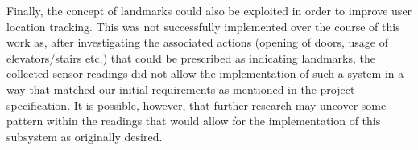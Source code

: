\documentclass[main.tex]{subfiles}
\begin{document}
            Finally, the concept of landmarks could also be exploited in order to improve user location tracking. This
            was not successfully implemented over the course of this work as, after investigating the associated actions (opening of doors, usage of elevators/stairs etc.) that could be prescribed as indicating landmarks,
            the collected sensor readings did not allow the implementation of such a system in a way that matched our initial requirements as mentioned in the project specification. It is possible, however, that further research may uncover some pattern within the readings that would allow for the implementation of this subsystem as originally desired.
\end{document}
